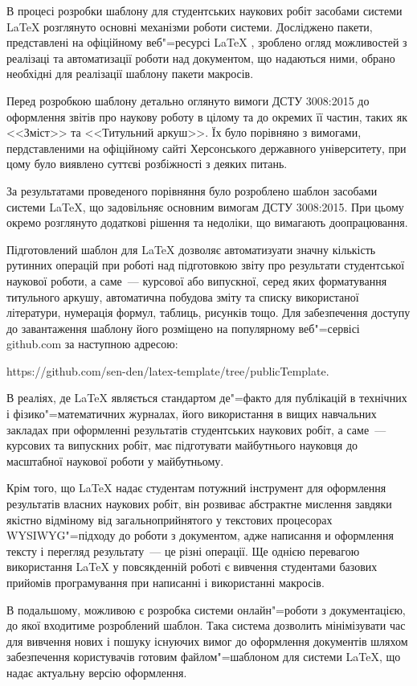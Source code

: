 
В процесі розробки шаблону для студентських наукових робіт засобами системи \LaTeX{} розглянуто основні механізми роботи системи. Досліджено пакети, представлені на офіційному веб"=ресурсі \LaTeX{} \cite{www:ctan}, зроблено огляд можливостей з реалізаці та автоматизації роботи над документом, що надаються ними, обрано необхідні для реалізації шаблону пакети макросів.

Перед розробкою шаблону детально оглянуто вимоги ДСТУ 3008:2015 до оформлення звітів про наукову роботу в цілому та до окремих її частин, таких як <<Зміст>> та <<Титульний аркуш>>. Їх було порівняно з вимогами, пердставленими на офіційному сайті Херсонського державного університету, при цому було виявлено суттєві розбіжності з деяких питань.

За результатами проведеного порівняння було розроблено шаблон засобами системи \LaTeX{}, що задовільняє основним вимогам ДСТУ 3008:2015. При цьому окремо розглянуто додаткові рішення та недоліки, що вимагають доопрацювання.

Підготовлений шаблон для \LaTeX{} дозволяє автоматизуати значну кількість рутинних операцій при роботі над підготовкою звіту про результати студентської наукової роботи, а саме~--- курсової або випускної, серед яких форматування титульного аркушу, автоматична побудова зміту та списку використаної літератури, нумерація формул, таблиць, рисунків тощо. Для забезпечення доступу до завантаження шаблону його розміщено на популярному веб"=сервісі github.com за наступною адресою:

https://github.com/sen-den/latex-template/tree/publicTemplate.

В реаліях, де \LaTeX{} являється стандартом де"=факто для публікацій в технічних і фізико"=математичних журналах, його використання в вищих навчальних закладах при оформленні результатів студентських наукових робіт, а саме~--- курсових та випускних робіт, має підготувати майбутнього науковця до масштабної наукової роботи у майбутньому.

Крім того, що \LaTeX{} надає студентам потужний інструмент для оформлення результатів власних наукових робіт, він розвиває абстрактне мислення завдяки якістно відміному від загальноприйнятого у текстових процесорах WYSIWYG"=підходу до роботи з документом, адже написання и оформлення тексту і перегляд результату~--- це різні операції. Ще однією перевагою використання \LaTeX{} у повсякденній роботі є вивчення студентами базових прийомів програмування при написанні і використанні макросів.

В подальшому, можливою є розробка системи онлайн"=роботи з документацією, до якої входитиме розроблений шаблон. Така система дозволить мінімізувати час для вивчення нових і пошуку існуючих вимог до оформлення документів шляхом забезпечення користувачів готовим файлом"=шаблоном для системи \LaTeX{}, що надає актуальну версію оформлення.
